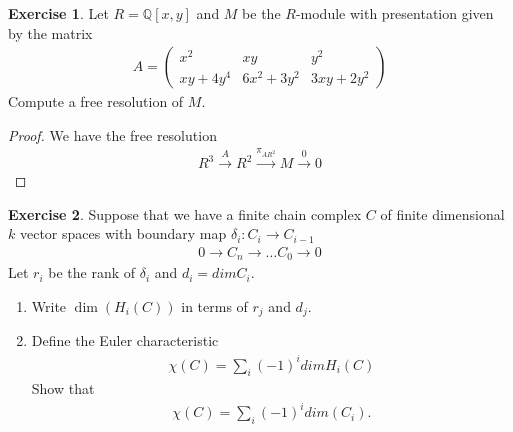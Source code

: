\documentclass[12pt]{extarticle}
\newcommand{\Q}{\mathbb{Q}}
\newcommand{\<}{\langle}
\renewcommand{\>}{\rangle}
\theoremstyle{definition}
\newtheorem{exercise}{Exercise}
\begin{document}
\begin{exercise}
  Let $R= \Q[x,y]$ and $M$ be the $R$-module with presentation given by the matrix
  \begin{align*}
    A =
    \begin{pmatrix}
      x^2     & xy          & y^2 \\
      xy+4y^4 & 6x^2 + 3y^2 & 3xy + 2y^2  
    \end{pmatrix}
  \end{align*}
  Compute a free resolution of $M$.
\end{exercise}
\begin{proof}
  We have the free resolution
  \begin{align*}
    R^3 \xrightarrow{A} R^2 \xrightarrow{\pi_{AR^2}} M \xrightarrow{0} 0 
  \end{align*}
\end{proof}
\begin{exercise}
  Suppose that we have a finite chain complex $C$ of finite dimensional $k$ vector spaces with boundary map $\delta_i: C_i \to C_{i-1}$
  \begin{align*}
    0 \to C_n \to \dots C_0 \to 0
  \end{align*}
  Let $r_i$ be the rank of $\delta_i$ and $d_i = dim C_i $.
    \begin{enumerate}
    \item
      Write $\dim(H_i(C))$ in terms of $r_j$ and $d_j$.
    \item
      Define the Euler characteristic
      \begin{align*}
        \chi(C) = \sum\limits_{i} (-1)^i dim H_i(C)
      \end{align*}
      Show that
      \begin{align*}
        \chi(C) = \sum\limits_{i} (-1)^i dim (C_i).
      \end{align*}
    \end{enumerate}
\end{exercise}
\end{document}
